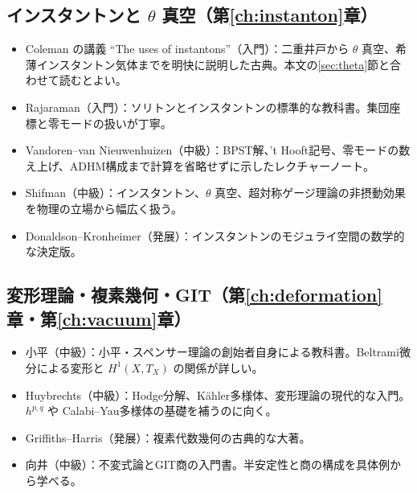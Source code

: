 \documentclass[uplatex, dvipdfmx, book]{jsbook}
\let\origsubsection\subsection
\let\origsubsubsection\subsubsection
\renewcommand{\section}{\origsubsection}
\renewcommand{\subsection}{\origsubsubsection}
\renewcommand{\subsubsection}{\paragraph}
\begin{document}
\section*{インスタントンと $\theta$ 真空（第\ref{ch:instanton}章）}
\begin{itemize}
    \item Coleman\cite{coleman1985} の講義 ``The uses of instantons''（入門）：二重井戸から $\theta$ 真空、希薄インスタントン気体までを明快に説明した古典。本文の\ref{sec:theta}節と合わせて読むとよい。
    \item Rajaraman\cite{rajaraman1982}（入門）：ソリトンとインスタントンの標準的な教科書。集団座標と零モードの扱いが丁寧。
    \item Vandoren--van Nieuwenhuizen\cite{vandorenvannieuwenhuizen2008}（中級）：BPST解、't Hooft記号、零モードの数え上げ、ADHM構成まで計算を省略せずに示したレクチャーノート。
    \item Shifman\cite{shifman2012}（中級）：インスタントン、$\theta$ 真空、超対称ゲージ理論の非摂動効果を物理の立場から幅広く扱う。
    \item Donaldson--Kronheimer\cite{donaldsonkronheimer1990}（発展）：インスタントンのモジュライ空間の数学的な決定版。
\end{itemize}

\section*{変形理論・複素幾何・GIT（第\ref{ch:deformation}章・第\ref{ch:vacuum}章）}
\begin{itemize}
    \item 小平\cite{kodaira1986}（中級）：小平・スペンサー理論の創始者自身による教科書。Beltrami微分による変形と $H^1(X, T_X)$ の関係が詳しい。
    \item Huybrechts\cite{huybrechts2005}（中級）：Hodge分解、K\"ahler多様体、変形理論の現代的な入門。$h^{p,q}$ や Calabi--Yau多様体の基礎を補うのに向く。
    \item Griffiths--Harris\cite{griffithsharris1978}（発展）：複素代数幾何の古典的な大著。
    \item 向井\cite{mukai2003}（中級）：不変式論とGIT商の入門書。半安定性と商の構成を具体例から学べる。
\end{itemize}
\end{document}
